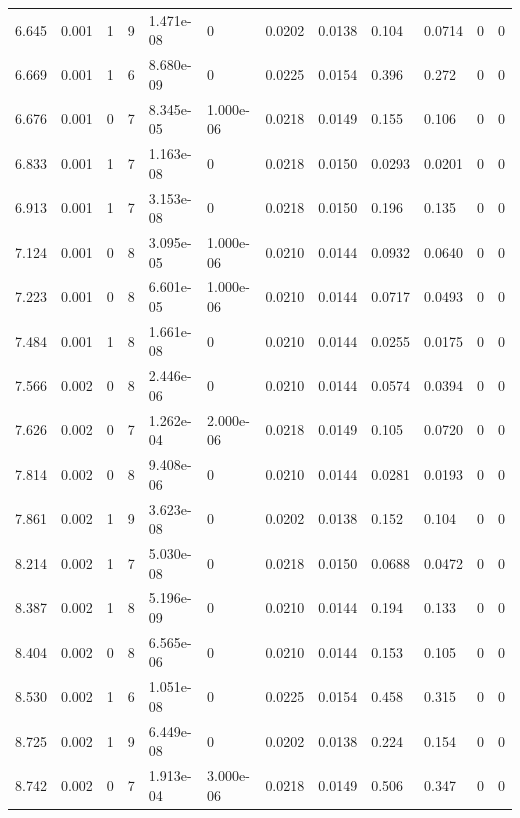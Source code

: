 \documentclass[preview]{standalone}
\begin{document}
{{{\begin{tabular}{L{1.2cm}C{1.2cm} C{0.3cm}C{0.5cm} C{1.4cm}C{1.4cm} C{1.4cm}C{1.4cm} C{1.6cm}C{1.6cm} C{1.6cm}C{1.6cm}}
  6.645  &  0.001  & 1     &  9 &  1.471e-08  & 0  &  0.0202&   0.0138& 0.104 & 0.0714   &  0 & 0  \\ 
  6.669  &  0.001  & 1     &  6 &  8.680e-09  & 0  &  0.0225&   0.0154& 0.396 & 0.272   &  0 & 0  \\ 
  6.676  &  0.001  & 0     &  7 &  8.345e-05  & 1.000e-06  &  0.0218&   0.0149& 0.155 & 0.106   &  0 & 0  \\ 
  6.833  &  0.001  & 1     &  7 &  1.163e-08  & 0  &  0.0218&   0.0150& 0.0293 & 0.0201   &  0 & 0  \\ 
  6.913  &  0.001  & 1     &  7 &  3.153e-08  & 0  &  0.0218&   0.0150& 0.196 & 0.135   &  0 & 0  \\ 
  7.124  &  0.001  & 0     &  8 &  3.095e-05  & 1.000e-06  &  0.0210&   0.0144& 0.0932 & 0.0640   &  0 & 0  \\ 
  7.223  &  0.001  & 0     &  8 &  6.601e-05  & 1.000e-06  &  0.0210&   0.0144& 0.0717 & 0.0493   &  0 & 0  \\ 
  7.484  &  0.001  & 1     &  8 &  1.661e-08  & 0  &  0.0210&   0.0144& 0.0255 & 0.0175   &  0 & 0  \\ 
  7.566  &  0.002  & 0     &  8 &  2.446e-06  & 0  &  0.0210&   0.0144& 0.0574 & 0.0394   &  0 & 0  \\ 
  7.626  &  0.002  & 0     &  7 &  1.262e-04  & 2.000e-06  &  0.0218&   0.0149& 0.105 & 0.0720   &  0 & 0  \\ 
  7.814  &  0.002  & 0     &  8 &  9.408e-06  & 0  &  0.0210&   0.0144& 0.0281 & 0.0193   &  0 & 0  \\ 
  7.861  &  0.002  & 1     &  9 &  3.623e-08  & 0  &  0.0202&   0.0138& 0.152 & 0.104   &  0 & 0  \\ 
  8.214  &  0.002  & 1     &  7 &  5.030e-08  & 0  &  0.0218&   0.0150& 0.0688 & 0.0472   &  0 & 0  \\ 
  8.387  &  0.002  & 1     &  8 &  5.196e-09  & 0  &  0.0210&   0.0144& 0.194 & 0.133   &  0 & 0  \\ 
  8.404  &  0.002  & 0     &  8 &  6.565e-06  & 0  &  0.0210&   0.0144& 0.153 & 0.105   &  0 & 0  \\ 
  8.530  &  0.002  & 1     &  6 &  1.051e-08  & 0  &  0.0225&   0.0154& 0.458 & 0.315   &  0 & 0  \\ 
  8.725  &  0.002  & 1     &  9 &  6.449e-08  & 0  &  0.0202&   0.0138& 0.224 & 0.154   &  0 & 0  \\ 
  8.742  &  0.002  & 0     &  7 &  1.913e-04  & 3.000e-06  &  0.0218&   0.0149& 0.506 & 0.347   &  0 & 0  \\ 

\end{tabular}}}}
\end{document}
